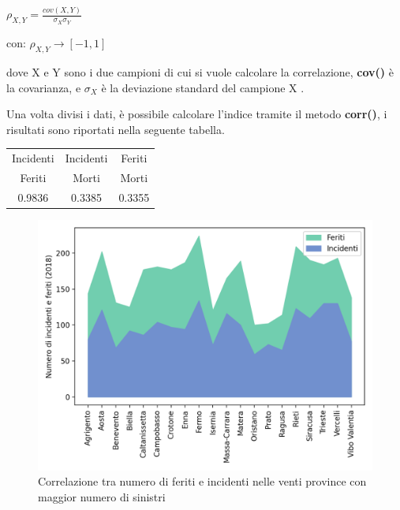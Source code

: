 \documentclass[a4paper,12pt]{report}
\newcommand{\methodstyle}[1]{\textbf{#1}}
\begin{document}
\begin{center}
    $\rho_{X, Y} = \displaystyle \frac{cov(X, Y)}{\sigma_X \sigma_Y}$
\end{center}

\begin{center}
    con: $\rho_{X, Y} \rightarrow [-1, 1]$
\end{center}

dove X e Y sono i due campioni di cui si vuole calcolare la correlazione, 
\methodstyle{cov()} è la covarianza, e $\sigma_X$ è la deviazione standard del 
campione X \cite{PROB_E_STATISTICA:3}.

Una volta divisi i dati, è possibile calcolare l'indice tramite il metodo 
\methodstyle{corr()}, i risultati sono riportati nella seguente tabella.

\begin{center}
    \def\arraystretch{1.5}%
    \begin{tabular}{ |c|c|c| } 
    \hline
    Incidenti & Incidenti & Feriti \\ 
    Feriti & Morti & Morti \\ 
    \hline
    0.9836 & 0.3385 & 0.3355 \\ 
    \hline
    \end{tabular}
\end{center}

\begin{figure}
    \includegraphics[width=\linewidth]{../src/incidenti/incidenti_aci/provincia/corr_incidenti.png}
    \caption{Correlazione tra numero di feriti e incidenti nelle venti province con maggior numero di sinistri}
    \label{fig:corr-incidenti-feriti}
\end{figure}
\end{document}
